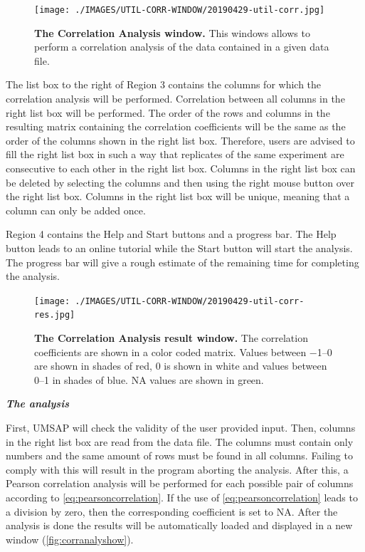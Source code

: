\begin{figure}[h]
	\centering
	\texttt{[image: ./IMAGES/UTIL-CORR-WINDOW/20190429-util-corr.jpg]}	    
	\caption[The Correlation Analysis window]{\textbf{The Correlation Analysis window.} This windows allows to perform a correlation analysis of the data contained in a given data file.} 
	\label{fig:corranalyset}
	\vspace{-5pt} 	
\end{figure}

The list box to the right of Region \num{3} contains the columns for which the correlation analysis will be performed. Correlation between all columns in the right list box will be performed. The  order of the rows and columns in the resulting matrix containing the correlation coefficients will be the same as the order of the columns shown in the right list box. Therefore, users are advised to fill the right list box in such a way that replicates of the same experiment are consecutive to each other in the right list box. Columns in the right list box can be deleted by selecting the columns and then using the right mouse button over the right list box. Columns in the right list box will be unique, meaning that a column can only be added once. 

Region \num{4} contains the Help and Start buttons and a progress bar. The Help button leads to an online tutorial while the Start button will start the analysis. The progress bar will give a rough estimate of the remaining time for completing the analysis.

\begin{figure}[h]
	\centering
	\texttt{[image: ./IMAGES/UTIL-CORR-WINDOW/20190429-util-corr-res.jpg]}	    
	\caption[The Correlation Analysis result window]{\textbf{The Correlation Analysis result window.} The correlation coefficients are shown in a color coded matrix. Values between \numrange{-1}{0} are shown in shades of red, \num{0} is shown in white and values between \numrange{0}{1} in shades of blue. NA values are shown in green.}
	\label{fig:corranalyshow}
	\vspace{-5pt} 	
\end{figure} 

\textit{\textbf{The analysis}}

First, UMSAP will check the validity of the user provided input. Then, columns in the right list box are read from the data file. The columns must contain only numbers and the same amount of rows must be found in all columns. Failing to comply with this will result in the program aborting the analysis. After this, a Pearson correlation \cite{Pearson1895} analysis will be performed for each possible pair of columns according to \autoref{eq:pearsoncorrelation}. If the use of \autoref{eq:pearsoncorrelation} leads to a division by zero, then the corresponding coefficient is set to NA. After the analysis is done the results will be automatically loaded and displayed in a new window (\autoref{fig:corranalyshow}). 

